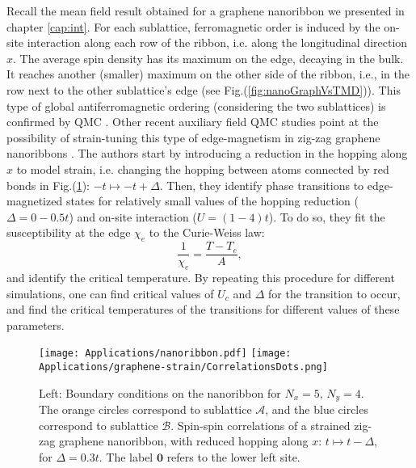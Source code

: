Recall the mean field result obtained for a graphene nanoribbon we presented in chapter \ref{cap:int}.
For each sublattice, ferromagnetic order is induced by the on-site interaction along each row of the ribbon, i.e. along the longitudinal direction $x$.
The average spin density has its maximum on the edge, decaying in the bulk.
It reaches another (smaller) maximum on the other side of the ribbon, i.e., in the row next to the other sublattice's edge (see Fig.(\ref{fig:nanoGraphVsTMD})).
This type of global antiferromagnetic ordering (considering the two sublattices) is confirmed by \ac{QMC} \cite{feldner_dynamical_2011, raczkowski_interplay_2017}.
Other recent auxiliary field \ac{QMC} studies point at the possibility of strain-tuning this type of edge-magnetism in zig-zag graphene nanoribbons \cite{yang_strain-tuning_2017}.
The authors start by introducing a reduction in the hopping along $x$ to model strain, i.e. changing the hopping between atoms connected by red bonds in Fig.(\ref{fig:bcRibbon}): $-t \mapsto -t + \Delta$.
Then, they identify phase transitions to edge-magnetized states for relatively small values of the hopping reduction ($\Delta = 0-0.5t$) and on-site interaction ($U = (1 - 4) t$).
To do so, they fit the susceptibility at the edge $\chi_e$ to the Curie-Weiss law:
\begin{equation}
\frac{1}{\chi_e} = \frac{T - T_c}{A} ,
\end{equation}
and identify the critical temperature.
By repeating this procedure for different simulations, one can find critical values of $U_c$ and $\Delta$ for the transition to occur, and find the critical temperatures of the transitions for different values of these parameters.

\begin{figure}[H]
\hspace{-0.8cm}
\texttt{[image: Applications/nanoribbon.pdf]}
\texttt{[image: Applications/graphene-strain/CorrelationsDots.png]}
	\caption[Boundary conditions on the nanoribbon. Spin-spin correlations of a strained zig-zag graphene nanoribbon.]{Left: Boundary conditions on the nanoribbon for $N_x = 5, \, N_y = 4$. The orange circles correspond to sublattice $\mathcal{A}$, and the blue circles correspond to sublattice $\mathcal{B}$.
	Spin-spin correlations of a strained zig-zag graphene nanoribbon, with reduced hopping along $x$: $t \mapsto t - \Delta$, for $\Delta = 0.3t$. The label $\bm 0$ refers to the lower left site.
}
	\label{fig:bcRibbon}
\end{figure}

